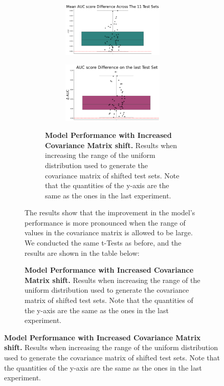 \begin{figure}[H]
\begin{figure}[H]
\begin{figure}[H]
\begin{subfigure}{.45\textwidth}
    \end{subfigure}
    \begin{subfigure}{.45\textwidth}
        \centering
        \includegraphics[width=\linewidth]{assets/3_075.png}
        
    \end{subfigure}
    \begin{subfigure}{.45\textwidth}
        \centering
        \includegraphics[width=\linewidth]{assets/4_075.png}
        
    \end{subfigure}
    \caption{\textbf{Model Performance with Increased Covariance Matrix shift.} Results when increasing the range of the uniform distribution used to generate the covariance matrix of shifted test sets. Note that the quantities of the y-axis are the same as the ones in the last experiment.}
\end{figure}


The results show that the improvement in the model's performance is more pronounced when the range of values in the covariance matrix is allowed to be large.
We conducted the same t-Tests as before, and the results are shown in the table below:


\end{figure}
\end{figure}
